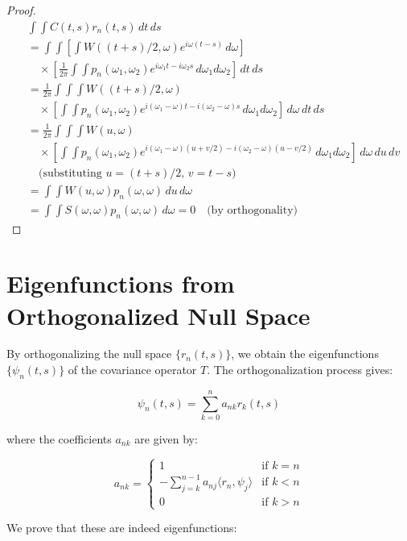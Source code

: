 \documentclass{article}
\begin{document}
\begin{proof}
\begin{align*}
&\int\int C(t,s) r_n(t,s) \, dt \, ds \\
&= \int\int \left[\int W((t+s)/2, \omega) e^{i\omega(t-s)} \, d\omega\right] \\
&\quad \times \left[\frac{1}{2\pi} \int\int p_n(\omega_1,\omega_2) e^{i\omega_1t - i\omega_2s} \, d\omega_1 d\omega_2\right] \, dt \, ds \\
&= \frac{1}{2\pi} \int\int\int W((t+s)/2, \omega) \\
&\quad \times \left[\int\int p_n(\omega_1,\omega_2) e^{i(\omega_1-\omega)t - i(\omega_2-\omega)s} \, d\omega_1 d\omega_2\right] \, d\omega \, dt \, ds \\
&= \frac{1}{2\pi} \int\int\int W(u, \omega) \\
&\quad \times \left[\int\int p_n(\omega_1,\omega_2) e^{i(\omega_1-\omega)(u+v/2) - i(\omega_2-\omega)(u-v/2)} \, d\omega_1 d\omega_2\right] \, d\omega \, du \, dv \\
&\quad \text{(substituting $u=(t+s)/2$, $v=t-s$)} \\
&= \int\int W(u, \omega) p_n(\omega,\omega) \, du \, d\omega \\
&= \int\int S(\omega,\omega) p_n(\omega,\omega) \, d\omega = 0 \quad \text{(by orthogonality)}
\end{align*}
\end{proof}

\section{Eigenfunctions from Orthogonalized Null Space}

By orthogonalizing the null space $\{r_n(t,s)\}$, we obtain the eigenfunctions $\{\psi_n(t,s)\}$ of the covariance operator $T$. The orthogonalization process gives:

$$\psi_n(t,s) = \sum_{k=0}^n a_{nk} r_k(t,s)$$

where the coefficients $a_{nk}$ are given by:

$$a_{nk} = \begin{cases}
1 & \text{if } k = n \\
-\sum_{j=k}^{n-1} a_{nj} \langle r_n, \psi_j \rangle & \text{if } k < n \\
0 & \text{if } k > n
\end{cases}$$

We prove that these are indeed eigenfunctions:
\end{document}
